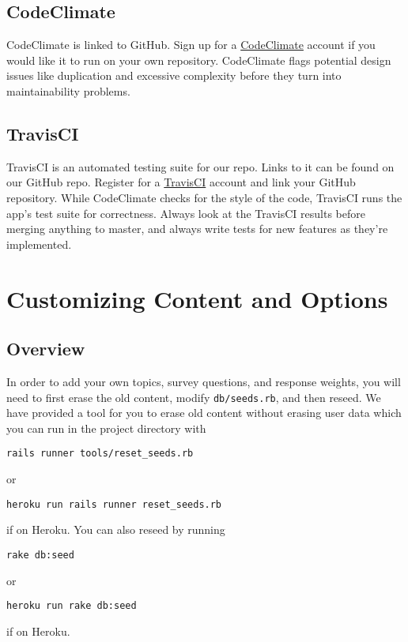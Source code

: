 \documentclass[12pt]{article}
\begin{document}
\subsection{CodeClimate}
CodeClimate is linked to GitHub. Sign up for a
\href{https://codeclimate.com}{CodeClimate} account if you would like it to run
on your own repository. CodeClimate flags potential design issues like
duplication and excessive complexity before they turn into maintainability
problems.

\subsection{TravisCI}
TravisCI is an automated testing suite for our repo. Links to it can be found on
our GitHub repo.  Register for a \href{https://travis-ci.org/}{TravisCI} account
and link your GitHub repository. While CodeClimate checks for the style of the
code, TravisCI runs the app's test suite for correctness. Always look at the
TravisCI results before merging anything to master, and always write tests for
new features as they're implemented.

\section{Customizing Content and Options}
\subsection{Overview}
In order to add your own topics, survey questions, and response weights, you
will need to first erase the old content, modify \texttt{db/seeds.rb}, and then reseed.
We have provided a tool for you to erase old content without erasing user data
which you can run in the project directory with
\begin{verbatim}
rails runner tools/reset_seeds.rb
\end{verbatim}
or
\begin{verbatim}
heroku run rails runner reset_seeds.rb
\end{verbatim}
if on Heroku. You can also reseed by running
\begin{verbatim}
rake db:seed
\end{verbatim}
or
\begin{verbatim}
heroku run rake db:seed
\end{verbatim}
if on Heroku.
\end{document}
